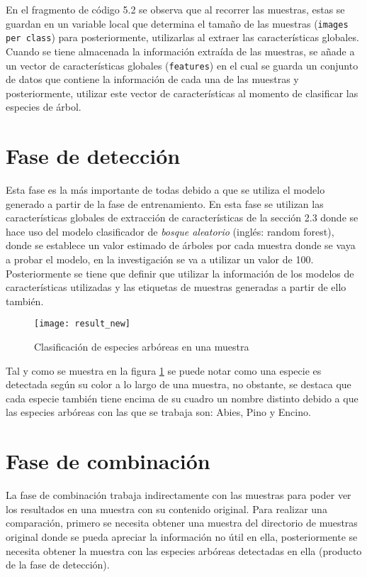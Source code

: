 En el fragmento de código 5.2 se observa que al recorrer las muestras, estas se guardan en un variable local que determina el tamaño de las muestras (\texttt{images per class}) para posteriormente, utilizarlas al extraer las características globales. Cuando se tiene almacenada la información extraída de las muestras, se añade a un vector de características globales (\texttt{features}) en el cual se guarda un conjunto de datos que contiene la información de cada una de las muestras y posteriormente, utilizar este vector de características al momento de clasificar las especies de árbol. 
\clearpage

\section{Fase de detección}
Esta fase es la más importante de todas debido a que se utiliza el modelo generado a partir de la fase de entrenamiento. En esta fase se utilizan las características globales de extracción de características de la sección 2.3 donde se hace uso del modelo clasificador de {\em bosque aleatorio} (inglés: random forest)\footnotemark, donde se establece un valor estimado de árboles por cada muestra donde se vaya a probar el modelo, en la investigación se va a utilizar un valor de 100. Posteriormente se tiene que definir que utilizar la información de los modelos de características utilizadas y las etiquetas de muestras generadas a partir de ello también. 
\\

\begin{figure}[H]
  \centering
  \begin{minipage}[b]{0.8\textwidth}
        \texttt{[image: result\_new]}
    \caption{Clasificación de especies arbóreas en una muestra}
    \label{Clasificación de especies arbóreas en una muestra}
  \end{minipage}
\end{figure}

Tal y como se muestra en la figura \ref{Clasificación de especies arbóreas en una muestra}  se puede notar como una especie es detectada según su color a lo largo de una muestra, no obstante, se destaca que cada especie también tiene encima de su cuadro un nombre distinto debido a que las especies arbóreas con las que se trabaja son: Abies, Pino y Encino. 

\section{Fase de combinación}
La fase de combinación trabaja indirectamente con las muestras para poder ver los resultados en una muestra con su contenido original. Para realizar una comparación, primero se necesita obtener una muestra del directorio de muestras original donde se pueda apreciar la información no útil en ella, posteriormente se necesita obtener la muestra con las especies arbóreas detectadas en ella (producto de la fase de detección).\\ 

